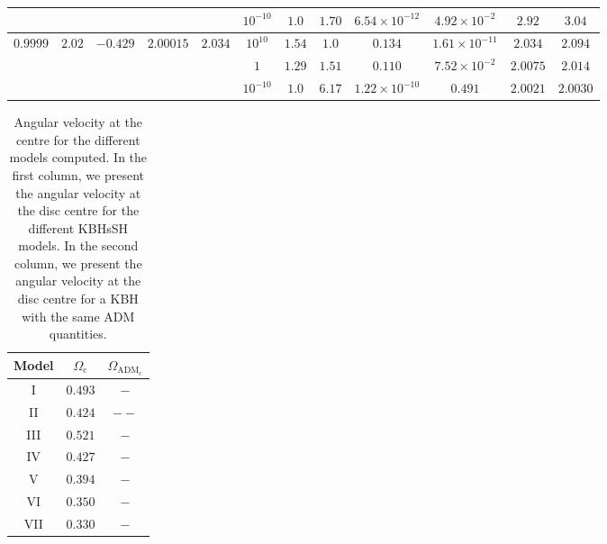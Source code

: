 \documentclass[twocolumn,aps,showpacs,showkeys,prd,superscriptaddress,byrevtex, amsmath]{revtex4-1}
\begin{document}
\begin{table}[t]
\begin{tabular}{c c c c c  c c c c c c c}
 \hline 
 &  &  &  &  & $10^{-10}$ & $1.0$ & $1.70$ & $6.54 \times 10^{-12}$ & $4.92 \times 10^{-2}$ & $2.92$ & $3.04$ \\ 
 \hline 
$0.9999$ & $2.02$ & $-0.429$ & $2.00015$ & $2.034$ & $10^{10}$ & $1.54$ & $1.0$ & $0.134$ & $1.61 \times 10^{-11}$ & $2.034$ & $2.094$ \\ 
\hline 
 &  &  &  &  & $1$ & $1.29$ & $1.51$ & $0.110$ & $7.52 \times 10^{-2}$ & $2.0075$ & $2.014$\\ 
\hline 
 &  &  &  &  & $10^{-10}$ & $1.0$ & $6.17$ & $1.22 \times 10^{-10}$ & $0.491$ & $2.0021$ & $2.0030$ \\ 
\hline   
\end{tabular}
\end{table}


\begin{table}
\caption{Angular velocity at the centre for the different models computed. In the first column, we present the angular velocity at the disc centre for the different KBHsSH models. In the second column, we present the angular velocity at the disc centre for a KBH with the same ADM quantities.}
\label{angular_velocity_table}      
\centering          
\begin{tabular}{c c c }
\hline\hline       
 Model & $\Omega_{\mathrm{c}}$ & $\Omega_{\mathrm{ADM_c}}$ \\ 
\hline           
I & $0.493$ & $-$ \\ 
 \hline 
II & $0.424$ & $--$ \\
 \hline 
III & $0.521$ & $-$ \\ 
 \hline 
IV & $0.427$ & $-$ \\ 
 \hline 
V & $0.394$ & $-$ \\ 
 \hline 
VI & $0.350$ & $-$ \\ 
 \hline 
VII & $0.330$ & $-$ \\ 
\hline      
\end{tabular}
\end{table}
\end{document}
